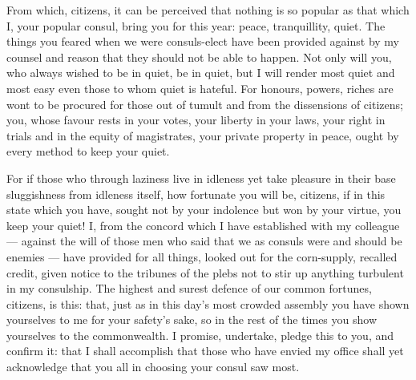  From which, citizens, it can be perceived that nothing is so popular as that which I, your popular consul, bring you for this year: peace, tranquillity, quiet. The things you feared when we were consuls-elect have been provided against by my counsel and reason that they should not be able to happen. Not only will you, who always wished to be in quiet, be in quiet, but I will render most quiet and most easy even those to whom quiet is hateful. For honours, powers, riches are wont to be procured for those out of tumult and from the dissensions of citizens; you, whose favour rests in your votes, your liberty in your laws, your right in trials and in the equity of magistrates, your private property in peace, ought by every method to keep your quiet.

 For if those who through laziness live in idleness yet take pleasure in their base sluggishness from idleness itself, how fortunate you will be, citizens, if in this state which you have, sought not by your indolence but won by your virtue, you keep your quiet! I, from the concord which I have established with my colleague --- against the will of those men who said that we as consuls were and should be enemies --- have provided for all things, looked out for the corn-supply, recalled credit, given notice to the tribunes of the plebs not to stir up anything turbulent in my consulship. The highest and surest defence of our common fortunes, citizens, is this: that, just as in this day's most crowded assembly you have shown yourselves to me for your safety's sake, so in the rest of the times you show yourselves to the commonwealth. I promise, undertake, pledge this to you, and confirm it: that I shall accomplish that those who have envied my office shall yet acknowledge that you all in choosing your consul saw most.
